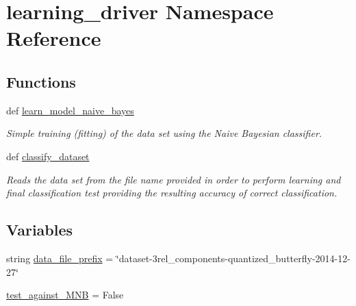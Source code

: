 \hypertarget{namespacelearning__driver}{\section{learning\+\_\+driver Namespace Reference}
\label{namespacelearning__driver}
}
\subsection*{Functions}
\begin{DoxyCompactItemize}
\item 
def \hyperlink{namespacelearning__driver_ad2e2ed20567d88c2310e3d56f480ff92}{learn\+\_\+model\+\_\+naive\+\_\+bayes}
\begin{DoxyCompactList}\small\item\em Simple training (fitting) of the data set using the Naive Bayesian classifier. \end{DoxyCompactList}\item 
def \hyperlink{namespacelearning__driver_a271d5c1e1b4364940878a76fce303bdc}{classify\+\_\+dataset}
\begin{DoxyCompactList}\small\item\em Reads the data set from the file name provided in order to perform learning and final classification test providing the resulting accuracy of correct classification. \end{DoxyCompactList}\end{DoxyCompactItemize}
\subsection*{Variables}
\begin{DoxyCompactItemize}
\item 
string \hyperlink{namespacelearning__driver_abd05f3b18d8cfd764807c2bc99cd70de}{data\+\_\+file\+\_\+prefix} = \char`\"{}dataset-\/3rel\+\_\+components-\/quantized\+\_\+butterfly-\/2014-\/12-\/27\char`\"{}
\item 
\hyperlink{namespacelearning__driver_a5246f10c0d1e0b4f4df3597928bfbe22}{test\+\_\+against\+\_\+\+M\+N\+B} = False
\end{DoxyCompactItemize}


